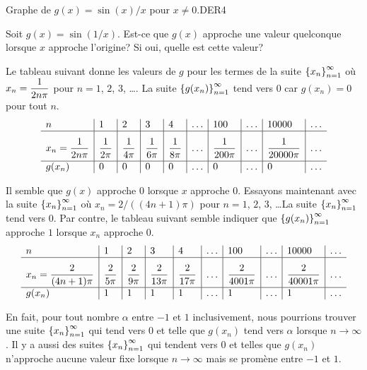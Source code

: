{
{Graphe de $g(x) = \sin(x)/x$ pour $x\neq 0$.}{DER4}

\begin{egg}
Soit $g(x) = \sin(1/x)$.  Est-ce que $g(x)$ approche une valeur quelconque
lorsque $x$ approche l'origine?  Si oui, quelle est cette valeur?

Le tableau suivant donne les valeurs de $g$ pour les termes de la
suite $\displaystyle \left\{x_n\right\}_{n=1}^\infty$ où
$\displaystyle x_n = \frac{1}{2n \pi}$ pour $n=1$, $2$, $3$, \ldots.
La suite $\displaystyle \left\{g(x_n)\right\}_{n=1}^\infty$ tend
vers $0$ car $g(x_n) = 0$ pour tout $n$.
\[
\begin{array}{l|l|l|l|l|l|l|l|l|l}
n & 1 & 2 & 3 & 4 & \ldots & 100 & \ldots & 10000 & \ldots \\
\hline
\rule[-1em]{0ex}{3em} \DS x_n = \frac{1}{2n \pi} &
\DS \frac{1}{2\pi} & \DS \frac{1}{4\pi} &
\DS \frac{1}{6\pi} & \DS \frac{1}{8\pi} &
\ldots & \DS \frac{1}{200\pi} &
\ldots & \DS \frac{1}{20000\pi} & \ldots \\
\hline
g(x_n) & 0 & 0 & 0 & 0 & \ldots & 0 & \ldots & 0 & \ldots
\end{array}
\]

Il semble que $g(x)$ approche $0$ lorsque $x$ approche $0$.  Essayons
maintenant avec la suite $\displaystyle \left\{x_n\right\}_{n=1}^\infty$
où $x_n = 2/((4n+1)\pi)$ pour $n=1$, $2$, $3$, \ldots  La suite
$\displaystyle \left\{x_n\right\}_{n=1}^\infty$ tend vers $0$.  Par
contre, le tableau suivant semble indiquer que
$\displaystyle \left\{g(x_n)\right\}_{n=1}^\infty$
approche $1$ lorsque $x_n$ approche $0$.
\[
\begin{array}{l|l|l|l|l|l|l|l|l|l}
n & 1 & 2 & 3 & 4 & \ldots & 100 & \ldots & 10000 & \ldots \\
\hline
\rule[-1em]{0ex}{3em} \DS x_n = \frac{2}{(4n+1)\pi} &
\DS \frac{2}{5\pi} & \DS \frac{2}{9\pi} &
\DS \frac{2}{13\pi} & \DS \frac{2}{17\pi} &
\ldots & \DS \frac{2}{4001\pi} &
\ldots & \DS \frac{2}{40001\pi} & \ldots \\
\hline
g(x_n) & 1 & 1 & 1 & 1 & \ldots & 1 & \ldots & 1 & \ldots
\end{array}
\]

En fait, pour tout nombre $\alpha$ entre $-1$ et $1$ inclusivement, nous
pourrions trouver une suite $\displaystyle \left\{x_n\right\}_{n=1}^\infty$
qui tend vers $0$ et telle que $g(x_n)$ tend vers $\alpha$ lorsque
$n\to \infty$.  Il y a aussi des suites
$\displaystyle \left\{x_n\right\}_{n=1}^\infty$ qui
tendent vers $0$ et telles que $g(x_n)$ n'approche aucune valeur fixe
lorsque $n \to \infty$ mais se promène entre $-1$ et $1$.


\end{egg}}
